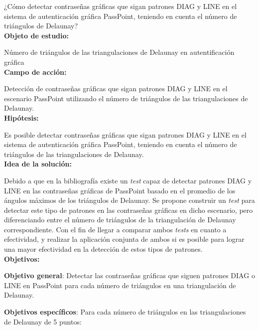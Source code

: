 \documentclass[12pt]{report}
\begin{document}
\normalsize{¿Cómo  detectar contraseñas gráficas que sigan patrones DIAG y LINE  en el sistema de autenticación gráfica PassPoint, teniendo en cuenta el número de triángulos de Delaunay?}\\
	
	\large{\textbf{Objeto de estudio:}}
	
	\normalsize{Número de triángulos de las  triangulaciones de Delaunay  en autentificación gráfica}\\
	
		   
	\large{\textbf{Campo de acción:}}
	
	\normalsize{Detección de contraseñas gráficas que sigan patrones DIAG y LINE en el escenario PassPoint   utilizando  el número de triángulos de las triangulaciones de Delaunay}.\\
	 
	\large{\textbf{Hipótesis:}}

	\normalsize{Es posible detectar contraseñas gráficas que sigan patrones DIAG y LINE en el sistema de autenticación gráfica PassPoint, teniendo en cuenta el número de triángulos  de las triangulaciones de Delaunay}.\\
		
	
	\large{\textbf{Idea de la solución:}}
	
	\normalsize{
		Debido a que en la bibliografía existe un \textit{test} capaz de detectar patrones DIAG y LINE en las contraseñas gráficas de PassPoint basado en el promedio de los ángulos máximos de los triángulos de Delaunay. Se propone construir un \textit{test} para detectar este tipo de patrones en las contraseñas gráficas en dicho escenario, pero diferenciando entre el número de triángulos de la triangulación de Delaunay correspondiente. Con el fin de llegar a comparar ambos \textit{tests} en cuanto a efectividad, y realizar la aplicación conjunta de ambos si es posible para lograr una mayor efectividad en la detección de estos tipos de patrones.
		}\\

	\large{\textbf{Objetivos:}}
	
	\normalsize{\textbf{Objetivo general}}: Detectar las contraseñas gráficas que siguen patrones DIAG o LINE en PassPoint para cada número de triángulos en una triangulación de Delaunay.
	
	\normalsize{\textbf{Objetivos específicos}}:
	Para cada número de triángulos  en las triangulaciones de Delaunay de 5 puntos:
	
\end{document}
